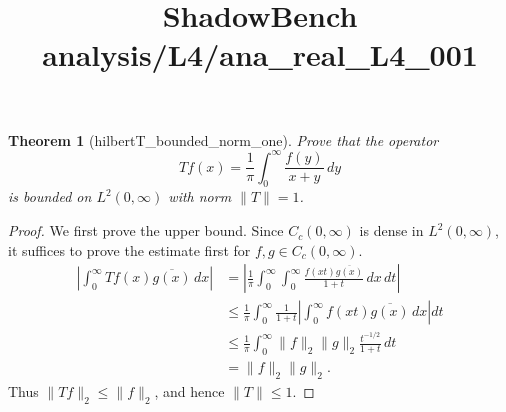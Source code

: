 \documentclass{article}
\title{ShadowBench analysis/L4/ana\_real\_L4\_001}
\newtheorem{theorem}{Theorem}
\begin{document}
\maketitle

\begin{theorem}[hilbertT_bounded_norm_one]
Prove that the operator
\[
Tf(x)=\frac{1}{\pi}\int_0^\infty \frac{f(y)}{x+y}\,dy
\]
is bounded on $L^2(0,\infty)$ with norm $\|T\|=1$.
\end{theorem}

\begin{proof}
We first prove the upper bound. Since \(C_c(0,\infty)\) is dense in
\(L^2(0,\infty)\), it suffices to prove the estimate first for
\(f,g\in C_c(0,\infty)\). 
\[
\begin{aligned}
\left|\int_0^\infty Tf(x)\overline{g(x)}\,dx\right|
&=
\left|
\frac1\pi\int_0^\infty\int_0^\infty
\frac{f(xt)\overline{g(x)}}{1+t}\,dx\,dt
\right|  \\
&\le
\frac1\pi\int_0^\infty
\frac{1}{1+t}
\left|
\int_0^\infty f(xt)\overline{g(x)}\,dx
\right|dt  \\
&\le
\frac1\pi\int_0^\infty
\|f\|_2\|g\|_2\frac{t^{-1/2}}{1+t}\,dt  \\
&=
\|f\|_2\|g\|_2 .
\end{aligned}
\]
Thus $\|Tf\|_2\le \|f\|_2$, and hence $\|T\|\le 1$.


\end{proof}
\end{document}
